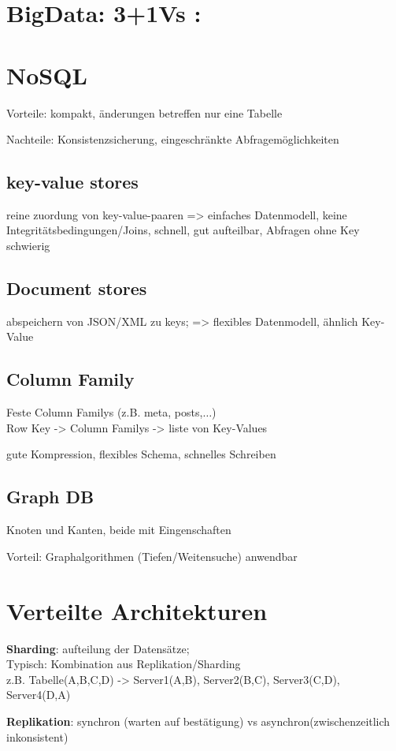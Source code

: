 
\section{BigData: 3+1Vs : }

\section{NoSQL}
Vorteile: kompakt, änderungen betreffen nur eine Tabelle

Nachteile: Konsistenzsicherung, eingeschränkte Abfragemöglichkeiten
\subsection{key-value stores}
reine zuordung von key-value-paaren => einfaches Datenmodell, keine Integritätsbedingungen/Joins, schnell, gut aufteilbar, Abfragen ohne Key schwierig

\subsection{Document stores}
abspeichern von JSON/XML zu keys; => flexibles Datenmodell, ähnlich Key-Value


\subsection{Column Family}
Feste Column Familys (z.B. meta, posts,$\dots$) \\
Row Key -> Column Familys -> liste von Key-Values

gute Kompression, flexibles Schema, schnelles Schreiben

\subsection{Graph DB}
Knoten und Kanten, beide mit Eingenschaften

Vorteil: Graphalgorithmen (Tiefen/Weitensuche) anwendbar

\section{Verteilte Architekturen}

\textbf{Sharding}: aufteilung der Datensätze; \\
Typisch: Kombination aus Replikation/Sharding\\
z.B. Tabelle(A,B,C,D) -> Server1(A,B), Server2(B,C), Server3(C,D), Server4(D,A)

\textbf{Replikation}: synchron (warten auf bestätigung) vs asynchron(zwischenzeitlich inkonsistent)
